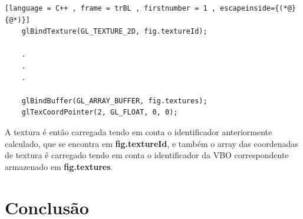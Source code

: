 \documentclass[a4paper]{article}
\begin{document}
\begin{lstlisting}[language = C++ , frame = trBL , firstnumber = 1 , escapeinside={(*@}{@*)}]
	glBindTexture(GL_TEXTURE_2D, fig.textureId);

	.
	.
	.

	glBindBuffer(GL_ARRAY_BUFFER, fig.textures);
	glTexCoordPointer(2, GL_FLOAT, 0, 0);
\end{lstlisting}

A textura é então carregada tendo em conta o identificador anteriormente calculado, que se encontra em \textbf{fig.textureId}, e também o array das coordenadas de textura é carregado tendo em conta o identificador da VBO correspondente armazenado em \textbf{fig.textures}.



\section{Conclusão}
\label{sec:conclusao}
\end{document}

